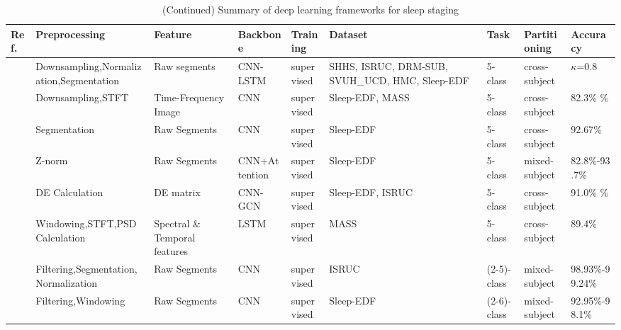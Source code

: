\begin{table*}[ht]
\renewcommand{\arraystretch}{1.2}
\caption*{(Continued) Summary of deep learning frameworks for sleep staging}
\footnotesize
\begin{tabular}{p{0.4cm}p{2.8cm}p{2cm}p{1.5cm}p{1.9cm}p{1.9cm}p{0.8cm}p{1.8cm}p{2cm}}
\hline
\textbf{Ref.} & \textbf{Preprocessing} & \textbf{Feature} & \textbf{Backbone} & \textbf{Training} & \textbf{Dataset} & \textbf{Task} & \textbf{Partitioning} & \textbf{Accuracy} \\
\hline
\cite{alvarez2021inter} & Downsampling,\newline Normalization,\newline Segmentation & Raw segments & CNN-LSTM & supervised & SHHS, ISRUC, DRM-SUB, SVUH\_UCD, HMC, Sleep-EDF& 5-class &cross-subject & $\kappa$=0.8 \\
~\cite{Sleep35} & Downsampling,STFT & Time-Frequency Image & CNN & supervised & Sleep-EDF, \newline MASS & 5-class  & cross-subject & 82.3\% \newline 83.6\% \\
~\cite{Sleep36} & Segmentation & Raw Segments & CNN & supervised & Sleep-EDF & 5-class  & cross-subject & 92.67\% \\
~\cite{Sleep37} & Z-norm & Raw Segments & CNN+Attention & supervised & Sleep-EDF & 5-class  & mixed-subject & 82.8\%-93.7\% \\
~\cite{Sleep38} & DE Calculation & DE matrix & CNN-GCN & supervised & Sleep-EDF, \newline ISRUC & 5-class  & cross-subject & 91.0\% \newline
87.4\% \\
~\cite{Sleep39} & Windowing,STFT,PSD Calculation & Spectral \& Temporal features & LSTM & supervised & MASS & 5-class  & cross-subject & 89.4\% \\
~\cite{Sleep44} & Filtering,Segmentation,\newline Normalization & Raw Segments & CNN & supervised & ISRUC & (2-5)-class & mixed-subject & 98.93\%-99.24\% \\
~\cite{mousavi2019deep} & Filtering,Windowing & Raw Segments & CNN & supervised & Sleep-EDF & (2-6)-class  & mixed-subject & 92.95\%-98.1\% \\

\end{tabular}
\end{table*}
